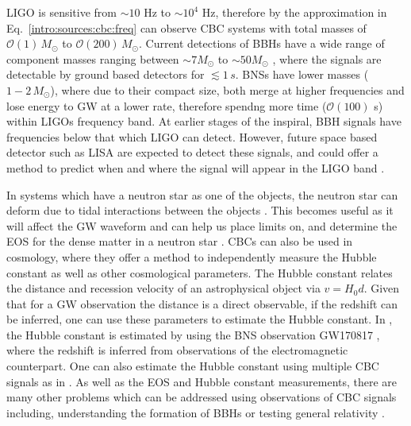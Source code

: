 \gls{LIGO} is sensitive from $\sim 10$ Hz to $\sim 10^4$ Hz, therefore by the
approximation in Eq.~\ref{intro:sources:cbc:freq} can observe \gls{CBC} systems with total masses of $\mathcal{O}(1)\,M_{\odot}$ to
$\mathcal{O}(200)\, M_{\odot}$. Current detections of \glspl{BBH} have a wide
range of component masses ranging between $\sim 7M_{\odot}$ to $\sim
50M_{\odot}$
\citep{ligoscientificcollaborationandvirgocollaboration2019GWTC1GravitationalWave},
where the signals are detectable by ground based detectors for $\lesssim 1\,s$.
\glspl{BNS} have lower masses ($1-2\,M_{\odot}$), where due to their compact
size, both merge at higher frequencies and lose energy to \gls{GW} at a lower
rate, therefore spendng more time ($\mathcal{O}(100)$ s) within \glspl{LIGO}
frequency band.  At earlier stages of the inspiral, \gls{BBH} signals have
frequencies below that which \gls{LIGO} can detect.  However, future space
based detector such as \gls{LISA} \citep{danzmann1996LISALaser} are expected to
detect these signals, and could offer a method to predict when and where the
signal will appear in the \gls{LIGO} band \citep{sesana2016ProspectsMultiband}. 

In systems which have a neutron star as one of the objects, the neutron star
can deform due to tidal interactions between the objects
\citep{flanagan2008ConstrainingNeutronstar}.  This becomes useful as it will
affect the \gls{GW} waveform and can help us place limits on, and determine the
\gls{EOS} for the dense matter in a neutron star
\citep{harry2018ObservingMeasuring}.  \glspl{CBC} can also be used in
cosmology, where they offer a method to independently measure the Hubble
constant as well as other cosmological parameters.  The Hubble constant relates
the distance and recession velocity of an astrophysical object via $v = H_0 d$.
Given that for a \gls{GW} observation the distance is a direct observable, if
the redshift can be inferred, one can use these parameters to estimate the
Hubble constant.  In
\cite{theligoscientificcollaborationandthevirgocollaboration2017GravitationalwaveStandard},
the Hubble constant is estimated by using the \gls{BNS} observation GW170817
\citep{abbott2017GW170817Observation}, where the redshift is inferred from
observations of the electromagnetic counterpart.  One can also estimate the Hubble constant using multiple \gls{CBC} signals as in \citep{delpozzo2012InferenceCosmological}.  As well as the \gls{EOS} and Hubble constant measurements, there are many other problems which can be addressed using observations of \gls{CBC} signals including, understanding the formation of \glspl{BBH}
\citep{zevin2017ConstrainingFormation,mandel2018MergingStellarmass} or testing
general relativity
\citep{theligoscientificcollaborationandthevirgocollaboration2019TestsGeneral}. 

